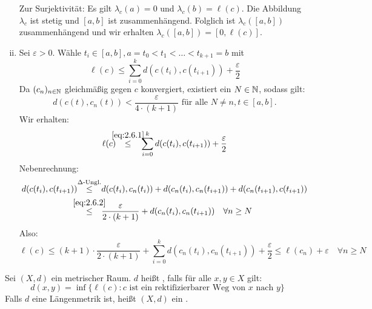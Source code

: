 \begin{beweis}
\begin{enumerate}[(i)]
		Zur Surjektivität:
		Es gilt $\lambda_c(a) = 0$ und $\lambda_c(b) = \ell(c)$.
		Die Abbildung $\lambda_c$ ist stetig und $[a,b]$ ist zusammenhängend.
		Folglich ist $\lambda_c([a,b])$ zusammenhängend und wir erhalten $\lambda_c([a,b]) = [0,\ell(c)]$. \setcounter{enumi}{6}
		\item Sei $\varepsilon >0$. 
		Wähle $t_i \in [a,b], a = t_0 < t_1 < \dots < t_{k+1} = b$ mit
		\begin{equation}
			\ell(c) \leq \sum\limits_{i=0}^{k} d(c(t_i),c(t_{i+1})) + \frac{\varepsilon}{2} \label{eq:2.6.1}
		\end{equation}
		Da $(c_n)_{n \in \mathbb{N}}$ gleichmäßig gegen $c$ konvergiert, existiert ein $N \in \mathbb{N}$, sodass gilt:
		\begin{equation}
			d(c(t),c_n(t)) < \frac{\varepsilon}{4 \cdot (k+1)} \text{ für alle } N \neq n, t \in [a,b]. \label{eq:2.6.2}
		\end{equation}
		Wir erhalten:
		\begin{equation}
			\ell(c) \stack{\eqref{eq:2.6.1}}{\leq} \sum\limits_{i=0}^{k} d(c(t_i),c(t_{i+1})) + \frac{\varepsilon}{2}
		\end{equation}
		Nebenrechnung:
		\begin{align*}
			d(c(t_i),c(t_{i+1})) &\stack{\Delta\text{-Ungl.}}{\leq} d(c(t_i),c_n(t_i)) + d(c_n(t_i),c_n(t_{i+1})) + d(c_n(t_{i+1}),c(t_{i+1})) \\
			&\stack{\eqref{eq:2.6.2}}{\leq} \frac{\varepsilon}{2 \cdot (k+1)} + d(c_n(t_i),c_n(t_{i+1})) \quad \forall n \geq N
		\end{align*}
		Also:
		\[
			\ell(c) \leq (k+1) \cdot \frac{\varepsilon}{2 \cdot (k+1)} + \sum\limits_{i=0}^{k} d(c_n(t_i),c_n(t_{i+1})) + \frac{\varepsilon}{2} \leq \ell(c_n) + \varepsilon \quad \forall n \geq N 
		\]
	\end{enumerate}
\end{beweis}

\begin{definition}
\label{def:2.7}
	Sei $(X,d)$ ein metrischer Raum.
	$d$ heißt , falls für alle $x,y \in X$ gilt:
	\[
		d(x,y) = \inf \{ \ell(c) : c \text{ ist ein rektifizierbarer Weg von } x \text{ nach } y \}
	\]
	Falls $d$ eine Längenmetrik ist, heißt $(X,d)$ ein .
\end{definition}

